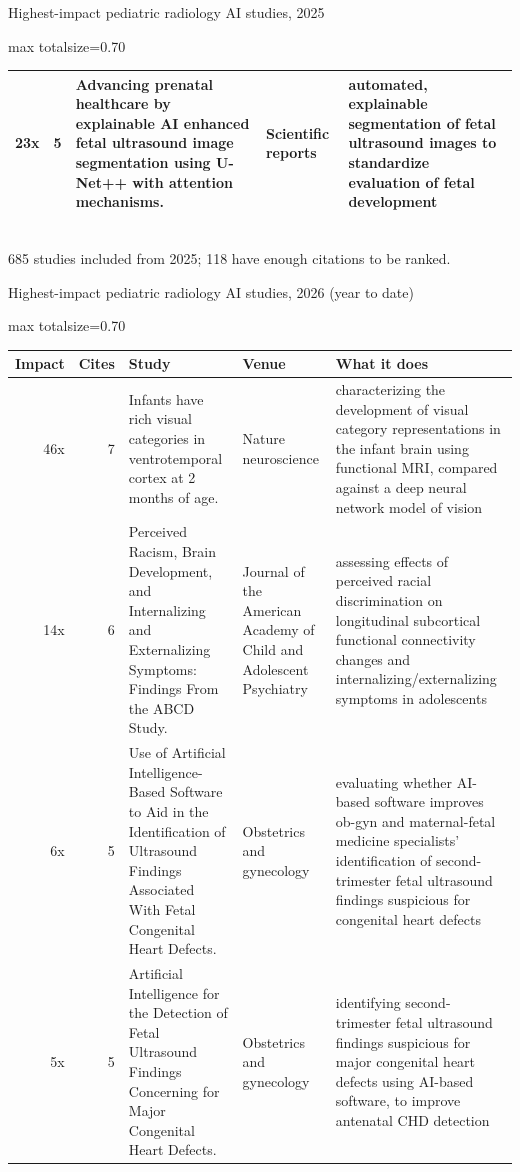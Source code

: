 \documentclass[aspectratio=169]{beamer}
\renewcommand{\arraystretch}{1.08}
\begin{document}
\begin{frame}[category=Journals/Preprints]{Highest-impact pediatric radiology AI studies, 2025}
\begin{adjustbox}{max totalsize={\textwidth}{0.70\textheight}}
\begin{tabular}{|r|r|>{\raggedright\arraybackslash}p{}|>{\raggedright\arraybackslash}p{}|>{\raggedright\arraybackslash}p{}|}
23x & 5 & Advancing prenatal healthcare by explainable AI enhanced fetal ultrasound image segmentation using U-Net++ with attention mechanisms. & Scientific reports & automated, explainable segmentation of fetal ultrasound images to standardize evaluation of fetal development \\ \hline
\end{tabular}
\end{adjustbox}
\\[2pt]
{\tiny 685 studies included from 2025; 118 have enough citations to be ranked. }
\end{frame}

\begin{frame}[category=Journals/Preprints]{Highest-impact pediatric radiology AI studies, 2026 (year to date)}
\tiny
\begin{adjustbox}{max totalsize={\textwidth}{0.70\textheight}}
\renewcommand{\arraystretch}{1.2}
\begin{tabular}{|r|r|>{\raggedright\arraybackslash}p{}|>{\raggedright\arraybackslash}p{}|>{\raggedright\arraybackslash}p{}|}
\hline \textbf{Impact} & \textbf{Cites} & \textbf{Study} & \textbf{Venue} & \textbf{What it does} \\ \hline
46x & 7 & Infants have rich visual categories in ventrotemporal cortex at 2 months of age. & Nature neuroscience & characterizing the development of visual category representations in the infant brain using functional MRI, compared against a deep neural network model of vision \\ \hline
14x & 6 & Perceived Racism, Brain Development, and Internalizing and Externalizing Symptoms: Findings From the ABCD Study. & Journal of the American Academy of Child and Adolescent Psychiatry & assessing effects of perceived racial discrimination on longitudinal subcortical functional connectivity changes and internalizing/externalizing symptoms in adolescents \\ \hline
6x & 5 & Use of Artificial Intelligence-Based Software to Aid in the Identification of Ultrasound Findings Associated With Fetal Congenital Heart Defects. & Obstetrics and gynecology & evaluating whether AI-based software improves ob-gyn and maternal-fetal medicine specialists' identification of second-trimester fetal ultrasound findings suspicious for congenital heart defects \\ \hline
5x & 5 & Artificial Intelligence for the Detection of Fetal Ultrasound Findings Concerning for Major Congenital Heart Defects. & Obstetrics and gynecology & identifying second-trimester fetal ultrasound findings suspicious for major congenital heart defects using AI-based software, to improve antenatal CHD detection \\ \hline

\end{tabular}
\end{adjustbox}
\end{frame}
\end{document}
